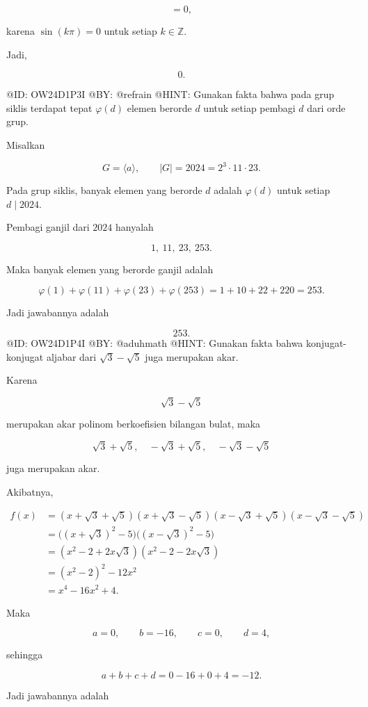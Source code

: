 $$
=0,
$$

karena $\sin(k\pi)=0$ untuk setiap $k\in\mathbb Z$.

Jadi,

$$
\boxed{0.}
$$

@ID: OW24D1P3I
@BY: @refrain
@HINT: Gunakan fakta bahwa pada grup siklis terdapat tepat $\varphi(d)$ elemen berorde $d$ untuk setiap pembagi $d$ dari orde grup.

Misalkan

$$
G=\langle a\rangle,
\qquad |G|=2024=2^3\cdot11\cdot23.
$$

Pada grup siklis, banyak elemen yang berorde $d$ adalah $\varphi(d)$ untuk setiap $d\mid2024$.

Pembagi ganjil dari $2024$ hanyalah

$$
1,\ 11,\ 23,\ 253.
$$

Maka banyak elemen yang berorde ganjil adalah

$$
\varphi(1)+\varphi(11)+\varphi(23)+\varphi(253)
=1+10+22+220
=253.
$$

Jadi jawabannya adalah

$$
\boxed{253.}
$$
@ID: OW24D1P4I
@BY: @aduhmath
@HINT: Gunakan fakta bahwa konjugat-konjugat aljabar dari $\sqrt3-\sqrt5$ juga merupakan akar.

Karena

$$
\sqrt3-\sqrt5
$$

merupakan akar polinom berkoefisien bilangan bulat, maka

$$
\sqrt3+\sqrt5,\quad
-\sqrt3+\sqrt5,\quad
-\sqrt3-\sqrt5
$$

juga merupakan akar.

Akibatnya,

$$
\begin{aligned}
f(x)
&=(x+\sqrt3+\sqrt5)(x+\sqrt3-\sqrt5)
(x-\sqrt3+\sqrt5)(x-\sqrt3-\sqrt5)\\
&=\bigl((x+\sqrt3)^2-5\bigr)
\bigl((x-\sqrt3)^2-5\bigr)\\
&=(x^2-2+2x\sqrt3)(x^2-2-2x\sqrt3)\\
&=(x^2-2)^2-12x^2\\
&=x^4-16x^2+4.
\end{aligned}
$$

Maka

$$
a=0,\qquad
b=-16,\qquad
c=0,\qquad
d=4,
$$

sehingga

$$
a+b+c+d
=0-16+0+4
=-12.
$$

Jadi jawabannya adalah

